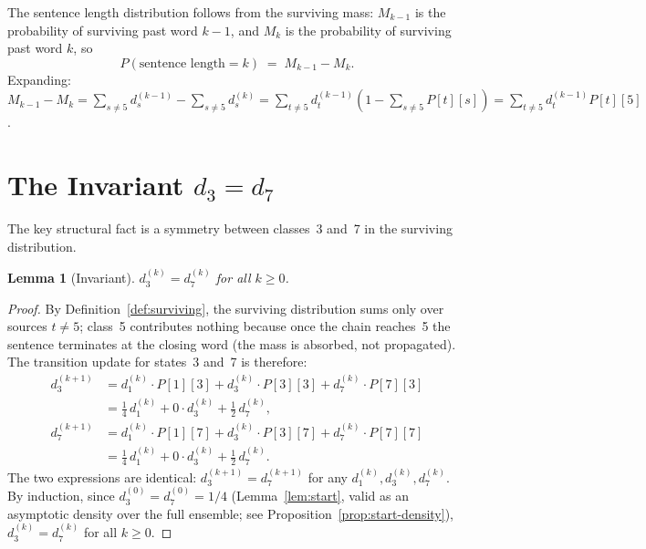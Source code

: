 \documentclass[12pt]{article}
\newtheorem{lemma}[theorem]{Lemma}
\theoremstyle{definition}
\theoremstyle{remark}
\begin{document}
The sentence length distribution follows from the surviving mass:
$M_{k-1}$ is the probability of surviving past word $k-1$, and $M_k$
is the probability of surviving past word $k$, so
\[
  P(\text{sentence length} = k) \;=\; M_{k-1} - M_k.
\]
Expanding: $M_{k-1} - M_k = \sum_{s \neq 5} d_s^{(k-1)} - \sum_{s \neq 5} d_s^{(k)}
= \sum_{t \neq 5} d_t^{(k-1)}\!\left(1 - \sum_{s \neq 5} P[t][s]\right)
= \sum_{t \neq 5} d_t^{(k-1)} P[t][5]$.

\section{The Invariant $d_3 = d_7$}
\label{sec:invariant}

The key structural fact is a symmetry between classes~3 and~7 in the
surviving distribution.

\begin{lemma}[Invariant]
\label{lem:invariant}
$d_3^{(k)} = d_7^{(k)}$ for all $k \geq 0$.
\end{lemma}

\begin{proof}
By Definition~\ref{def:surviving}, the surviving distribution sums only
over sources $t \neq 5$; class~5 contributes nothing because once the
chain reaches~5 the sentence terminates at the closing word (the mass is absorbed, not
propagated). The transition update for states~3 and~7 is therefore:
\begin{align*}
d_3^{(k+1)} &= d_1^{(k)} \cdot P[1][3] + d_3^{(k)} \cdot P[3][3] + d_7^{(k)} \cdot P[7][3] \\
             &= \tfrac{1}{4}\,d_1^{(k)} + 0 \cdot d_3^{(k)} + \tfrac{1}{2}\,d_7^{(k)}, \\[4pt]
d_7^{(k+1)} &= d_1^{(k)} \cdot P[1][7] + d_3^{(k)} \cdot P[3][7] + d_7^{(k)} \cdot P[7][7] \\
             &= \tfrac{1}{4}\,d_1^{(k)} + 0 \cdot d_3^{(k)} + \tfrac{1}{2}\,d_7^{(k)}.
\end{align*}
The two expressions are identical: $d_3^{(k+1)} = d_7^{(k+1)}$ for any
$d_1^{(k)}, d_3^{(k)}, d_7^{(k)}$.
By induction, since $d_3^{(0)} = d_7^{(0)} = 1/4$ (Lemma~\ref{lem:start},
valid as an asymptotic density over the full ensemble;
see Proposition~\ref{prop:start-density}),
$d_3^{(k)} = d_7^{(k)}$ for all $k \geq 0$.
\end{proof}
\end{document}
